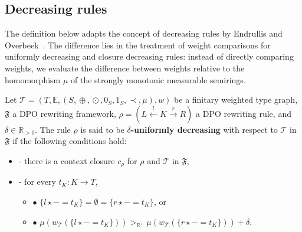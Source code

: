
        
\subsection{Decreasing rules}
\label{nwf:sec:decreasing_rules}
The definition below adapts the concept of decreasing rules by Endrullis and Overbeek~\cite{endrullis2024generalized_arxiv_v2}. The difference lies in the treatment of weight comparisons for uniformly decreasing and closure decreasing rules: instead of directly comparing weights, we evaluate the difference between weights relative to the homomorphism $\mu$ of the strongly monotonic measurable semirings.

\begin{definition} 
    \label{nwf:def:decreasing_rule}
    Let $\mathcal{T} \mathop{=} (T,\mathbb{E}, (S, \mathop{\oplus}, \mathop{\odot}, 0_S, 1_S, \prec, \mu), w)$ be a finitary weighted type graph, \(\mathfrak{F}\) a DPO rewriting framework, $\rho \mathop{=} (L \overset{l}{\leftarrow} K \overset{r}{\rightarrow} R)$ a DPO rewriting rule, and $\delta \mathop{\in} \mathbb{R}_{>0}$. 
    \noindent
    The rule $\rho$ is said to be \textbf{$\delta$-uniformly decreasing} with respect to $\mathcal{T}$ in $\mathfrak{F}$ if the following conditions hold:
        \begin{itemize}
            \item[]- there is a context closure $c_\rho$ for $\rho$ and $\mathcal{T}$ in $\mathfrak{F}$, 
            \item[]- for every $t_K : K \mathop{\to} T$,
            \begin{itemize}
                \item[] $\bullet$ $\{l \mathop{\star} - \mathop{=} t_K\} \mathop{=} \emptyset \mathop{=} \{r \mathop{\star} - \mathop{=} t_K\}$, or
                \item[] $\bullet$ $\mu(w_\mathcal{T}(\{l \mathop{\star} - \mathop{=} t_K\}))  >_{\mathbb{R}^+}   \mu(w_\mathcal{T}(\{r \mathop{\star} - \mathop{=} t_K\}))\mathop{+}\delta$.
            \end{itemize}
        \end{itemize}  
         

\end{definition}
